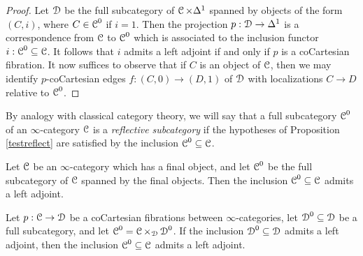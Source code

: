 \begin{proof}
Let $\operatorname{\mathcal{D}}$ be the full subcategory of $\operatorname{\mathcal{C}} \times \Delta^1$ spanned by objects
of the form $(C,i)$, where $C \in \operatorname{\mathcal{C}}^0$ if $i=1$. Then the projection $p: \operatorname{\mathcal{D}} \rightarrow \Delta^1$ is a correspondence from $\operatorname{\mathcal{C}}$ to $\operatorname{\mathcal{C}}^0$ which is associated to the inclusion functor $i: \operatorname{\mathcal{C}}^0 \subseteq \operatorname{\mathcal{C}}$. It follows that $i$ admits a left adjoint if and only if
$p$ is a coCartesian fibration. It now suffices to observe that if $C$ is an object of $\operatorname{\mathcal{C}}$, then we may identify $p$-coCartesian edges $f: (C,0) \rightarrow (D,1)$ of $\operatorname{\mathcal{D}}$ with
localizations $C \rightarrow D$ relative to $\operatorname{\mathcal{C}}^{0}$.
\end{proof}

\begin{remark}\label{reflective}
By analogy with classical category theory, we will say that a full subcategory $\operatorname{\mathcal{C}}^0$ of an $\infty$-category $\operatorname{\mathcal{C}}$ is a {\it reflective subcategory} if the hypotheses of Proposition \ref{testreflect} are satisfied by the inclusion $\operatorname{\mathcal{C}}^0 \subseteq \operatorname{\mathcal{C}}$. 
\end{remark}

\begin{example}\label{swang}
Let $\operatorname{\mathcal{C}}$ be an $\infty$-category which has a final object, and let $\operatorname{\mathcal{C}}^{0}$ be the full subcategory of $\operatorname{\mathcal{C}}$ spanned by the final objects. Then the inclusion $\operatorname{\mathcal{C}}^{0} \subseteq \operatorname{\mathcal{C}}$ admits a left adjoint.
\end{example}

\begin{corollary}\label{sweng}
Let $p: \operatorname{\mathcal{C}} \rightarrow \operatorname{\mathcal{D}}$ be a coCartesian fibrations between $\infty$-categories, let
$\operatorname{\mathcal{D}}^{0} \subseteq \operatorname{\mathcal{D}}$ be a full subcategory, and let $\operatorname{\mathcal{C}}^{0} = \operatorname{\mathcal{C}} \times_{\operatorname{\mathcal{D}}} \operatorname{\mathcal{D}}^{0}$.
If the inclusion $\operatorname{\mathcal{D}}^{0} \subseteq \operatorname{\mathcal{D}}$ admits a left adjoint, then the inclusion
$\operatorname{\mathcal{C}}^{0} \subseteq \operatorname{\mathcal{C}}$ admits a left adjoint. 
\end{corollary}

